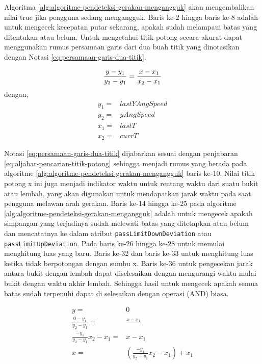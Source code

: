 Algoritma \ref{alg:algoritme-pendeteksi-gerakan-mengangguk} akan mengembalikan nilai true jika pengguna sedang mengangguk. Baris ke-2 hingga baris ke-8 adalah untuk mengecek kecepatan putar sekarang, apakah sudah melampaui batas yang ditentukan atau belum. Untuk mengetahui titik potong secara akurat dapat menggunakan rumus persamaan garis dari dua buah titik yang dinotasikan dengan Notasi \ref{eq:persamaan-garis-dua-titik}.   

\begin{equation}
		\frac{y-y_1}{y_2-y_1} = \frac{x-x_1}{x_2-x_1} \\
\label{eq:persamaan-garis-dua-titik}
\end{equation}
dengan,
\[
	\begin{split}
		y_1 = & lastYAngSpeed\\
		y_2 = & yAngSpeed\\
		x_1 = & lastT\\
		x_2 = & currT
	\end{split}
\]

Notasi \ref{eq:persamaan-garis-dua-titik} dijabarkan sesuai dengan penjabaran \ref{eq:aljabar-pencarian-titik-potong} sehingga menjadi rumus yang berada pada algoritme \ref{alg:algoritme-pendeteksi-gerakan-mengangguk} baris ke-10. Nilai titik potong x ini juga menjadi indikator waktu untuk rentang waktu dari suatu bukit atau lembah, yang akan digunakan untuk mendapatkan jarak waktu pada saat pengguna melawan arah gerakan. Baris ke-14 hingga ke-25 pada algoritme \ref{alg:algoritme-pendeteksi-gerakan-mengangguk} adalah untuk mengecek apakah simpangan yang terjadinya sudah melewati batas yang ditetapkan atau belum dan mencatatnya ke dalam atribut \texttt{passLimitDownDeviation} atau \texttt{passLimitUpDeviation}. Pada baris ke-26 hingga ke-28 untuk memulai menghitung luas yang baru. Baris ke-32 dan baris ke-33 untuk menghitung luas ketika tidak berpotongan dengan sumbu x. Baris ke-36 untuk pengecekan jarak antara bukit dengan lembah dapat diselesaikan dengan mengurangi waktu mulai bukit dengan waktu akhir lembah. Sehingga hasil untuk mengecek apakah semua batas sudah terpenuhi dapat di selesaikan dengan operasi (AND) biasa. 

\begin{equation}
	\begin{split}
		y = & 0\\		
		\frac{0-y_1}{y_2-y_1} = & \frac{x-x_1}{} \\
		\frac{-y_1}{y_2-y_1} x_2-x_1 = & x-x_1 \\
		x = & (\frac{-y_1}{y_2-y_1} x_2-x_1) +x_1
	\end{split}
\label{eq:aljabar-pencarian-titik-potong}
\end{equation}



